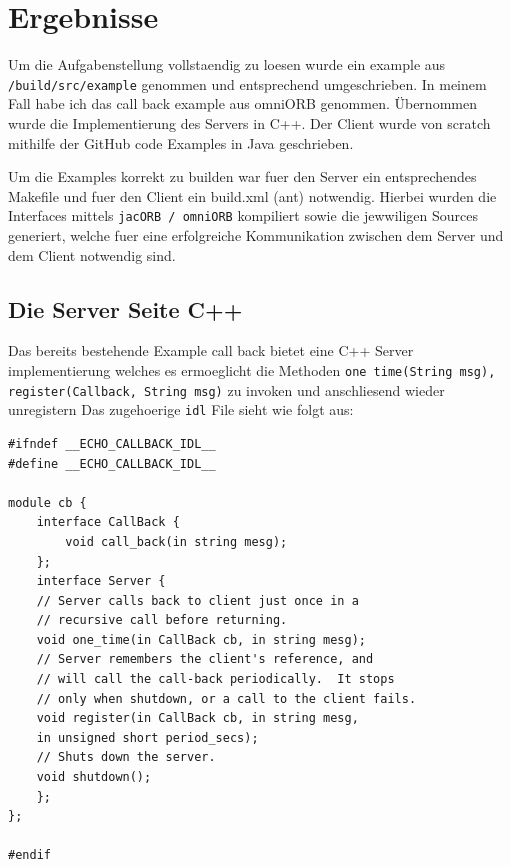 \clearpage
\section{Ergebnisse}
\label{sec:Ergebnisse}
Um die Aufgabenstellung vollstaendig zu loesen wurde ein example aus \texttt{/build/src/example} genommen und entsprechend umgeschrieben.
In meinem Fall habe ich das call back example aus omniORB genommen. Übernommen wurde die Implementierung des Servers in C++. Der Client wurde von scratch mithilfe der GitHub code Examples \cite{borkoRepo} in Java geschrieben.

Um die Examples korrekt zu builden war fuer den Server ein entsprechendes Makefile und fuer den Client ein build.xml (ant) notwendig. Hierbei wurden die Interfaces mittels \texttt{jacORB / omniORB} kompiliert sowie die jewwiligen Sources generiert, welche fuer eine erfolgreiche Kommunikation zwischen dem Server und dem Client notwendig sind.

\subsection{Die Server Seite C++}
Das bereits bestehende Example call back bietet eine C++ Server implementierung welches es ermoeglicht die  Methoden \texttt{one time(String msg), register(Callback, String msg)} zu invoken und anschliesend wieder unregistern
Das zugehoerige \texttt{idl} File sieht wie folgt aus:
\begin{lstlisting}[style=C++, caption=echo.idl call back]	
#ifndef __ECHO_CALLBACK_IDL__
#define __ECHO_CALLBACK_IDL__

module cb {
	interface CallBack {
		void call_back(in string mesg);
	};
	interface Server {
	// Server calls back to client just once in a
	// recursive call before returning.
	void one_time(in CallBack cb, in string mesg);
	// Server remembers the client's reference, and
	// will call the call-back periodically.  It stops
	// only when shutdown, or a call to the client fails.
	void register(in CallBack cb, in string mesg,
	in unsigned short period_secs);
	// Shuts down the server.
	void shutdown();
	};
};

#endif
\end{lstlisting}

\clearpage

